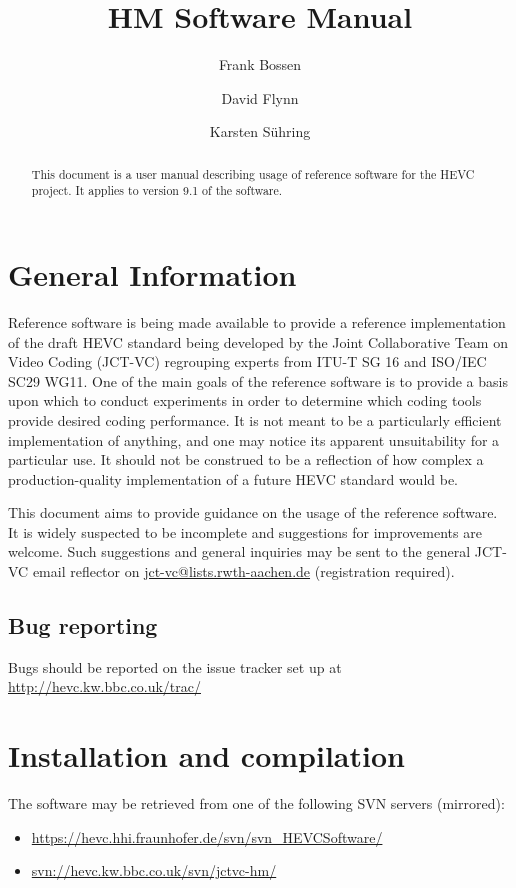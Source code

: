 \documentclass[a4paper,11pt]{jctvcdoc}
\title{HM Software Manual}
\author{%
	Frank Bossen
	\email{bossen@docomoinnovations.com}
	\and
	David Flynn
	\email{davidf@rd.bbc.co.uk}
	\and
	Karsten S\"uhring
	\email{Karsten.Suehring@hhi.fraunhofer.de}
}
\begin{document}
\maketitle
\begin{abstract}
This document is a user manual describing usage of reference software
for the HEVC project. It applies to version 9.1
of the software.
\end{abstract}

\tableofcontents
\listoftables

\section{General Information}
Reference software is being made available to provide a reference
implementation of the draft HEVC standard being developed by the Joint
Collaborative Team on Video Coding (JCT-VC) regrouping experts from
ITU-T SG 16 and ISO/IEC SC29 WG11. One of the main goals of the
reference software is to provide a basis upon which to conduct
experiments in order to determine which coding tools provide desired
coding performance. It is not meant to be a particularly efficient
implementation of anything, and one may notice its apparent
unsuitability for a particular use. It should not be construed to be a
reflection of how complex a production-quality implementation of a
future HEVC standard would be.

This document aims to provide guidance on the usage of the reference
software. It is widely suspected to be incomplete and suggestions for
improvements are welcome. Such suggestions and general inquiries may be
sent to the general JCT-VC email reflector on
\url{jct-vc@lists.rwth-aachen.de} (registration required).

\subsection*{Bug reporting}
Bugs should be reported on the issue tracker set up at
\url{http://hevc.kw.bbc.co.uk/trac/}

\section{Installation and compilation}
The software may be retrieved from one of the following SVN servers
(mirrored):
\begin{itemize}
\item \url{https://hevc.hhi.fraunhofer.de/svn/svn_HEVCSoftware/}
\item \url{svn://hevc.kw.bbc.co.uk/svn/jctvc-hm/}
\end{itemize}
\end{document}

